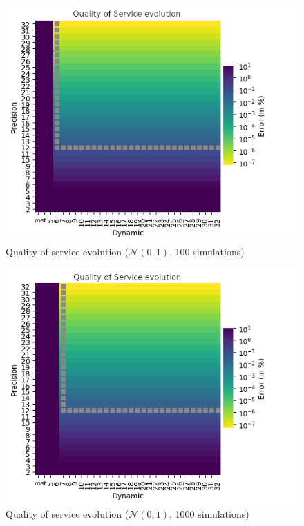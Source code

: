 \begin{figure}
    \centering
    \includegraphics[width=.8\textwidth]{Figures/results/d2-32_p2-32_e8-8_N0-1_s100-0.png}
    \caption{Quality of service evolution ($\mathcal{N}(0, 1)$, 100 simulations)}
    \label{app.quick:fig.qos0-1-100}
\end{figure}
\begin{figure}
    \centering
    \includegraphics[width=.8\textwidth]{Figures/results/d2-32_p2-32_e8-8_N0-1_s1000-0.png}
    \caption{Quality of service evolution ($\mathcal{N}(0, 1)$, 1000 simulations)}
    \label{app.quick:fig.qos0-1-1000}
\end{figure}

